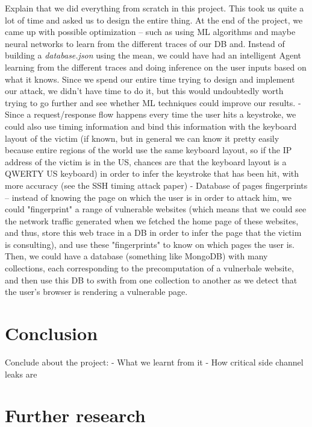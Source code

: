 \documentclass[runningheads]{llncs}
\begin{document}
Explain that we did everything from scratch in this project. This took us quite a lot of time and asked us to design the entire thing. At the end of the project, we came up with possible optimization -- such as using ML algorithms and maybe neural networks to learn from the different traces of our DB and. Instead of building a \textit{database.json} using the mean, we could have had an intelligent Agent learning from the different traces and doing inference on the user inputs based on what it knows. Since we spend our entire time trying to design and implement our attack, we didn't have time to do it, but this would undoubtedly worth trying to go further and see whether ML techniques could improve our results.
- Since a request/response flow happens every time the user hits a keystroke, we could also use timing information and bind this information with the keyboard layout of the victim (if known, but in general we can know it pretty easily because entire regions of the world use the same keyboard layout, so if the IP address of the victim is in the US, chances are that the keyboard layout is a QWERTY US keyboard) in order to infer the keystroke that has been hit, with more accuracy (see the SSH timing attack paper)
- Database of pages fingerprints -- instead of knowing the page on which the user is in order to attack him, we could "fingerprint" a range of vulnerable websites (which means that we could see the network traffic generated when we fetched the home page of these websites, and thus, store this web trace in a DB in order to infer the page that the victim is consulting), and use these "fingerprints" to know on which pages the user is. Then, we could have a database (something like MongoDB) with many collections, each corresponding to the precomputation of a vulnerbale website, and then use this DB to swith from one collection to another as we detect that the user's browser is rendering a vulnerable page.

\section{Conclusion}

Conclude about the project:
- What we learnt from it
- How critical side channel leaks are


\section{Further research}
\end{document}
